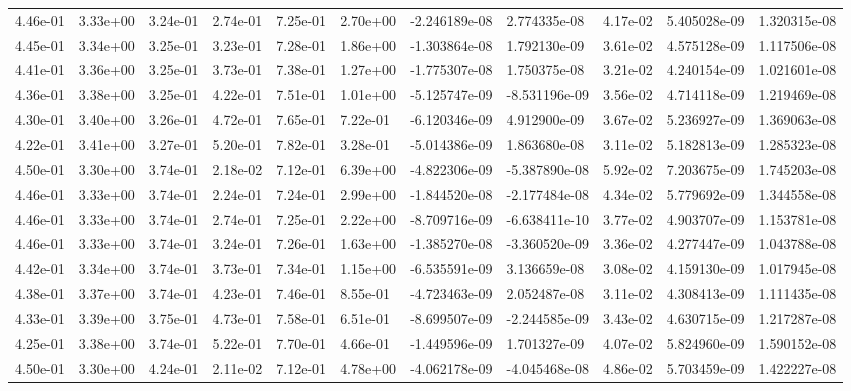 \begin{longtable}{| p{} | p{} |}
4.46e-01 & 3.33e+00 & 3.24e-01 & 2.74e-01 & 7.25e-01 & 2.70e+00 & -2.246189e-08 &  2.774335e-08 &  4.17e-02 &  5.405028e-09 &  1.320315e-08 \\
4.45e-01 & 3.34e+00 & 3.25e-01 & 3.23e-01 & 7.28e-01 & 1.86e+00 & -1.303864e-08 &  1.792130e-09 &  3.61e-02 &  4.575128e-09 &  1.117506e-08 \\
4.41e-01 & 3.36e+00 & 3.25e-01 & 3.73e-01 & 7.38e-01 & 1.27e+00 & -1.775307e-08 &  1.750375e-08 &  3.21e-02 &  4.240154e-09 &  1.021601e-08 \\
4.36e-01 & 3.38e+00 & 3.25e-01 & 4.22e-01 & 7.51e-01 & 1.01e+00 & -5.125747e-09 & -8.531196e-09 &  3.56e-02 &  4.714118e-09 &  1.219469e-08 \\
4.30e-01 & 3.40e+00 & 3.26e-01 & 4.72e-01 & 7.65e-01 & 7.22e-01 & -6.120346e-09 &  4.912900e-09 &  3.67e-02 &  5.236927e-09 &  1.369063e-08 \\
4.22e-01 & 3.41e+00 & 3.27e-01 & 5.20e-01 & 7.82e-01 & 3.28e-01 & -5.014386e-09 &  1.863680e-08 &  3.11e-02 &  5.182813e-09 &  1.285323e-08 \\
4.50e-01 & 3.30e+00 & 3.74e-01 & 2.18e-02 & 7.12e-01 & 6.39e+00 & -4.822306e-09 & -5.387890e-08 &  5.92e-02 &  7.203675e-09 &  1.745203e-08 \\
4.46e-01 & 3.33e+00 & 3.74e-01 & 2.24e-01 & 7.24e-01 & 2.99e+00 & -1.844520e-08 & -2.177484e-08 &  4.34e-02 &  5.779692e-09 &  1.344558e-08 \\
4.46e-01 & 3.33e+00 & 3.74e-01 & 2.74e-01 & 7.25e-01 & 2.22e+00 & -8.709716e-09 & -6.638411e-10 &  3.77e-02 &  4.903707e-09 &  1.153781e-08 \\
4.46e-01 & 3.33e+00 & 3.74e-01 & 3.24e-01 & 7.26e-01 & 1.63e+00 & -1.385270e-08 & -3.360520e-09 &  3.36e-02 &  4.277447e-09 &  1.043788e-08 \\
4.42e-01 & 3.34e+00 & 3.74e-01 & 3.73e-01 & 7.34e-01 & 1.15e+00 & -6.535591e-09 &  3.136659e-08 &  3.08e-02 &  4.159130e-09 &  1.017945e-08 \\
4.38e-01 & 3.37e+00 & 3.74e-01 & 4.23e-01 & 7.46e-01 & 8.55e-01 & -4.723463e-09 &  2.052487e-08 &  3.11e-02 &  4.308413e-09 &  1.111435e-08 \\
4.33e-01 & 3.39e+00 & 3.75e-01 & 4.73e-01 & 7.58e-01 & 6.51e-01 & -8.699507e-09 & -2.244585e-09 &  3.43e-02 &  4.630715e-09 &  1.217287e-08 \\
4.25e-01 & 3.38e+00 & 3.74e-01 & 5.22e-01 & 7.70e-01 & 4.66e-01 & -1.449596e-09 &  1.701327e-09 &  4.07e-02 &  5.824960e-09 &  1.590152e-08 \\
4.50e-01 & 3.30e+00 & 4.24e-01 & 2.11e-02 & 7.12e-01 & 4.78e+00 & -4.062178e-09 & -4.045468e-08 &  4.86e-02 &  5.703459e-09 &  1.422227e-08 \\

\end{longtable}
